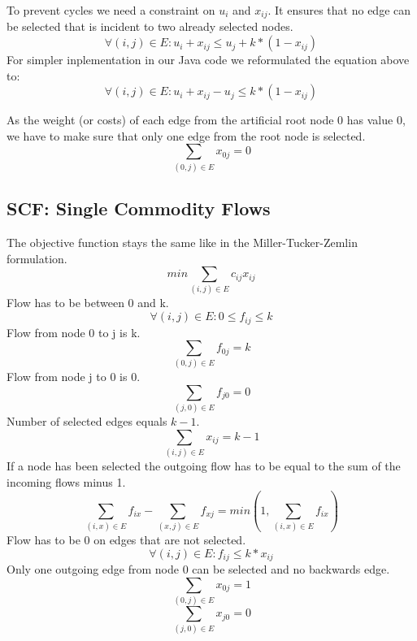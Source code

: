 \documentclass{article}
\begin{document}
To prevent cycles we need a constraint on $u_i$ and $x_{ij}$. It ensures that no edge can be selected that is incident to two already selected nodes.
\begin{equation}
\forall (i,j) \in E : u_i + x_{ij} \le u_j + k * ( 1 - x_{ij})
\end{equation}
For simpler inplementation in our Java code we reformulated the equation above to:
\begin{equation}
\forall (i,j) \in E : u_i + x_{ij} - u_j \le k * ( 1 - x_{ij})
\end{equation}

As the weight (or costs) of each edge from the artificial root node 0 has value 0, we have to make sure that only one edge from the root node is selected.
\begin{equation}
\sum_{(0,j) \in E} x_{0j} = 0
\end{equation}

\subsection{SCF: Single Commodity Flows \label{scf}}
The objective function stays the same like in the Miller-Tucker-Zemlin formulation.
\setcounter{equation}{0}
\begin{equation}
min \sum_{(i,j) \in E} c_{ij} x_{ij}
\end{equation}
Flow has to be between 0 and k.
\begin{equation}
\forall (i,j) \in E : 0 \le f_{ij} \le k 
\end{equation}
Flow from node 0 to j is k.
\begin{equation}
\sum_{(0,j) \in E} f_{0j} = k
\end{equation}
Flow from node j to 0 is 0.
\begin{equation}
\sum_{(j,0) \in E} f_{j0} = 0
\end{equation}
Number of selected edges equals $k-1$.
\begin{equation}
\sum_{(i,j) \in E} x_{ij} = k - 1
\end{equation}
If a node has been selected the outgoing flow has to be equal to the sum of the incoming flows minus 1. 
\begin{equation}
\sum_{(i,x) \in E} f_{ix} - \sum_{(x,j) \in E} f_{xj} = min(1, \sum_{(i,x) \in E} f_{ix})
\end{equation}
Flow has to be 0 on edges that are not selected.
\begin{equation}
\forall (i,j) \in E : f_{ij} \le k*x_{ij}
\end{equation}
Only one outgoing edge from node 0 can be selected and no backwards edge.
\begin{equation}
\sum_{(0,j) \in E} x_{0j} = 1
\end{equation}
\begin{equation}
\sum_{(j,0) \in E} x_{j0} = 0
\end{equation}
\end{document}
